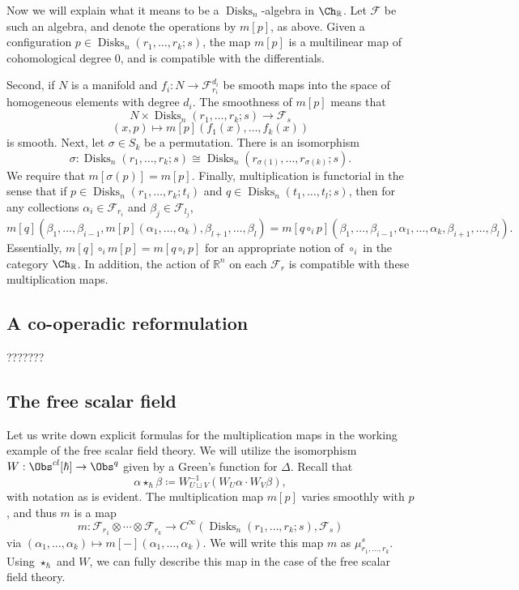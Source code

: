 Now we will explain what it means to be a $\operatorname{Disks} _n$-algebra in $\Ch_{\mathbb{R} }$. Let $\mathcal{F} $ be such an algebra, and denote the operations by $m[p]$, as above. Given a configuration $p\in \operatorname{Disks} _n(r_1, \ldots ,r_k ; s)$, the map $m[p]$ is a multilinear map of cohomological degree 0, and is compatible with the differentials.

Second, if $N$ is a manifold and $f_i : N \to \mathcal{F} _{r_i} ^{d_i} $ be smooth maps into the space of homogeneous elements with degree $d_i$. The smoothness of $m[p]$ means that
\[
	N\times \operatorname{Disks}_n(r_1, \ldots ,r_k ; s)\to \mathcal{F}_s
\]
\[
	(x,p) \mapsto m[p](f_1(x), \ldots ,f_k(x))
\]
is smooth. Next, let $\sigma \in S_k$ be a permutation. There is an isomorphism
\[
	\sigma : \operatorname{Disks}_n(r_1, \ldots , r_k ; s) \cong \operatorname{Disks} _n(r_{\sigma (1)} , \ldots ,r_{\sigma (k)} ; s)
.\]
We require that $m[\sigma (p)]=m[p]$. Finally, multiplication is functorial in the sense that if $p\in \operatorname{Disks}_n(r_1, \ldots ,r_k ; t_i)$ and $q\in \operatorname{Disks} _n(t_1, \ldots , t_l ; s)$, then for any collections $\alpha _i\in \mathcal{F} _{r_i} $ and $\beta _j\in \mathcal{F} _{l_j} $,
\[
	m[q](\beta _1, \ldots ,\beta _{i-1} ,m[p](\alpha _1, \ldots ,\alpha _k), \beta _{l+1} , \ldots ,\beta _l) = m[q\circ _ip](\beta _1, \ldots ,\beta _{i-1} ,\alpha _1, \ldots ,\alpha _k, \beta _{i+1} , \ldots ,\beta _l)
.\]
Essentially, $m[q]\circ _im[p] = m[q\circ_ip]$ for an appropriate notion of $\circ _i$ in the category $\Ch_{\mathbb{R} } $. In addition, the action of $\mathbb{R} ^n$ on each $\mathcal{F} _r$ is compatible with these multiplication maps.

\subsection{A co-operadic reformulation}

???????

\subsection{The free scalar field}

Let us write down explicit formulas for the multiplication maps in the working example of the free scalar field theory. We will utilize the isomorphism $W : \Obs^{cl} [\hbar ] \to \Obs^{q} $ given by a Green's function for $\Delta $. Recall that
\[
	\alpha \star _{\hbar } \beta \coloneqq W^{-1}_{U \sqcup V} (W_U\alpha \cdot W_V\beta )
,\]
with notation as is evident. The multiplication map $m[p]$ varies smoothly with $p$, and thus $m$ is a map
\[
	m : \mathcal{F}_{r_1} \otimes \cdots \otimes \mathcal{F} _{r_k}  \to C^\infty(\operatorname{Disks} _n(r_1, \ldots ,r_k ; s), \mathcal{F} _s)
\]
via $(\alpha _1, \ldots ,\alpha _k) \mapsto m[-](\alpha _1, \ldots ,\alpha _k)$. We will write this map $m$ as $\mu _{r_1, \ldots ,r_k} ^s$. Using $\star _{\hbar } $ and $W$, we can fully describe this map in the case of the free scalar field theory.

